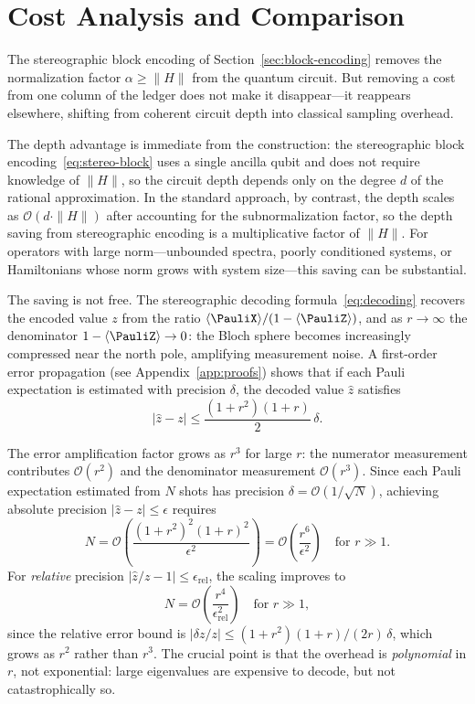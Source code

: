 \section{Cost Analysis and Comparison}
\label{sec:cost-analysis}

The stereographic block encoding of
Section~\ref{sec:block-encoding} removes the normalization
factor $\alpha \geq \|H\|$ from the quantum circuit.  But
removing a cost from one column of the ledger does not make it
disappear---it reappears elsewhere, shifting from coherent
circuit depth into classical sampling overhead.

The depth advantage is immediate from the construction:
the stereographic block encoding~\eqref{eq:stereo-block} uses
a single ancilla qubit and does not require knowledge of
$\|H\|$, so the circuit depth depends only on the degree $d$
of the rational approximation.  In the standard approach, by
contrast, the depth scales as $\mathcal{O}(d \cdot \|H\|)$
after accounting for the subnormalization factor, so the depth
saving from stereographic encoding is a multiplicative factor
of $\|H\|$.  For operators with large norm---unbounded spectra,
poorly conditioned systems, or Hamiltonians whose norm grows
with system size---this saving can be substantial.

The saving is not free.  The stereographic decoding
formula~\eqref{eq:decoding} recovers the encoded value $z$ from
the ratio $\langle\PauliX\rangle/(1 - \langle\PauliZ\rangle)$,
and as $r \to \infty$ the denominator
$1 - \langle\PauliZ\rangle \to 0$: the Bloch sphere becomes
increasingly compressed near the north pole, amplifying
measurement noise.  A first-order error propagation (see
Appendix~\ref{app:proofs}) shows that if each Pauli expectation
is estimated with precision $\delta$, the decoded value
$\hat{z}$ satisfies
\begin{equation}
	|\hat{z} - z| \leq \frac{(1+r^2)(1+r)}{2}\,\delta.
	\label{eq:error-bound}
\end{equation}

The error amplification factor grows as $r^3$ for large $r$:
the numerator measurement contributes $\mathcal{O}(r^2)$ and the
denominator measurement $\mathcal{O}(r^3)$.  Since each Pauli
expectation estimated from $N$ shots has precision
$\delta = \mathcal{O}(1/\sqrt{N})$, achieving absolute precision
$|\hat{z} - z| \leq \epsilon$ requires
\begin{equation}
	N = \mathcal{O}\!\left(\frac{(1+r^2)^2(1+r)^2}{\epsilon^2}\right) = \mathcal{O}\!\left(\frac{r^6}{\epsilon^2}\right) \quad \text{for } r \gg 1.
	\label{eq:shot-count}
\end{equation}
For \emph{relative} precision
$|\hat{z}/z - 1| \leq \epsilon_{\mathrm{rel}}$, the scaling
improves to
\begin{equation}
	N = \mathcal{O}\!\left(\frac{r^4}{\epsilon_{\mathrm{rel}}^2}\right) \quad \text{for } r \gg 1,
	\label{eq:shot-count-rel}
\end{equation}
since the relative error bound is
$|\delta z/z| \leq (1+r^2)(1+r)/(2r)\,\delta$, which grows as
$r^2$ rather than $r^3$.  The crucial point is that the overhead
is \emph{polynomial} in $r$, not exponential: large eigenvalues
are expensive to decode, but not catastrophically so.

